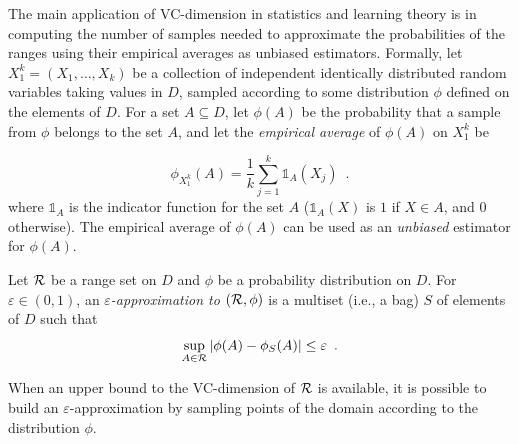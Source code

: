 The main application of VC-dimension in statistics and learning
theory is in computing the number of samples needed to approximate the
probabilities of the ranges using their empirical averages as
unbiased estimators. Formally, let $X_1^k=(X_1,\dotsc,X_k)$ be a collection of
independent identically distributed random variables taking values in $D$,
sampled according to some distribution $\phi$ defined on the elements of $D$.
For a set $A\subseteq D$, let $\phi(A)$ be the probability that a sample from
$\phi$ belongs to the set $A$, and let the \emph{empirical average} of $\phi(A)$
on $X_1^k$ be 

\[
\phi_{X_1^k}(A)=\frac{1}{k}\sum_{j=1}^k\mathds{1}_A(X_j)\enspace.%
\]
where $\mathds{1}_A$ is the indicator function for the set $A$
($\mathds{1}_A(X)$ is $1$ if $X\in A$, and 0 otherwise).  The empirical average
of $\phi(A)$ can be used as an \emph{unbiased} estimator
for $\phi(A)$.

\begin{definition}\label{def:eapprox}
  Let $\mathcal{R}$ be a range set on %
  $D$ and $\phi$ be a probability distribution on $D$. For $\varepsilon\in(0,1)$,
  an \emph{$\varepsilon$-approximation to $(\mathcal{R},\phi)$} is a multiset (i.e.,
  a bag) $S$ of elements of $D$ such that 
  \[
  \sup_{A\in\mathcal{R}}|\phi(A)-\phi_S(A)|\le\varepsilon\enspace.\]
\end{definition}

When an upper bound to the VC-dimension of $\mathcal{R}$ is available, it is possible
to build an $\varepsilon$-approximation by sampling points of
the domain according to the distribution $\phi$.

